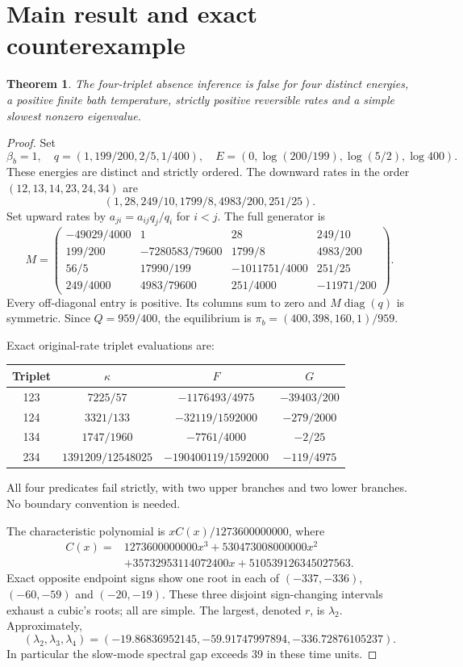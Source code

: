 \documentclass[11pt]{article}
\newtheorem{theorem}{Theorem}
\newcommand{\diag}{\operatorname{diag}}
\begin{document}
\section{Main result and exact counterexample}
\begin{theorem}
The four-triplet absence inference is false for four distinct energies, a positive finite bath temperature, strictly positive reversible rates and a simple slowest nonzero eigenvalue.
\end{theorem}
\begin{proof}
Set
\[
\beta_b=1,\quad q=(1,199/200,2/5,1/400),\quad
E=(0,\log(200/199),\log(5/2),\log400).
\]
These energies are distinct and strictly ordered. The downward rates in the order $(12,13,14,23,24,34)$ are
\[
(1,28,249/10,1799/8,4983/200,251/25).
\]
Set upward rates by $a_{ji}=a_{ij}q_j/q_i$ for $i<j$. The full generator is
\[
M=\begin{pmatrix}
-49029/4000&1&28&249/10\\
199/200&-7280583/79600&1799/8&4983/200\\
56/5&17990/199&-1011751/4000&251/25\\
249/4000&4983/79600&251/4000&-11971/200
\end{pmatrix}.
\]
Every off-diagonal entry is positive. Its columns sum to zero and $M\diag(q)$ is symmetric. Since $Q=959/400$, the equilibrium is $\pi_b=(400,398,160,1)/959$.

Exact original-rate triplet evaluations are:
\begin{center}
\begin{tabular}{cccc}
\toprule Triplet&$\kappa$&$F$&$G$\\\midrule
123&$7225/57$&$-1176493/4975$&$-39403/200$\\
124&$3321/133$&$-32119/1592000$&$-279/2000$\\
134&$1747/1960$&$-7761/4000$&$-2/25$\\
234&$1391209/12548025$&$-190400119/1592000$&$-119/4975$\\\bottomrule
\end{tabular}
\end{center}
All four predicates fail strictly, with two upper branches and two lower branches. No boundary convention is needed.

The characteristic polynomial is $xC(x)/1273600000000$, where
\begin{align*}
C(x)={}&1273600000000x^3+530473008000000x^2\\
&+35732953114072400x+510539126345027563.
\end{align*}
Exact opposite endpoint signs show one root in each of $(-337,-336)$, $(-60,-59)$ and $(-20,-19)$. These three disjoint sign-changing intervals exhaust a cubic's roots; all are simple. The largest, denoted $r$, is $\lambda_2$. Approximately,
\[
(\lambda_2,\lambda_3,\lambda_4)=(-19.86836952145,-59.91747997894,-336.72876105237).
\]
In particular the slow-mode spectral gap exceeds 39 in these time units.


\end{proof}
\end{document}
